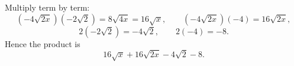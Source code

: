 Multiply term by term:
\[
(-4\sqrt{2x})(-2\sqrt2)=8\sqrt{4x}=16\sqrt x,\qquad (-4\sqrt{2x})(-4)=16\sqrt{2x},
\]
\[
2(-2\sqrt2)=-4\sqrt2,\qquad 2(-4)=-8 .
\]
Hence the product is
\[
\boxed{16\sqrt x+16\sqrt{2x}-4\sqrt2-8}.
\]
